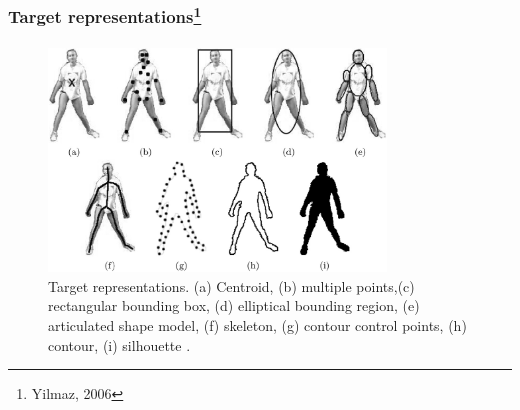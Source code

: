 \begin{frame}
\frametitle{Target representations\footnote{Yilmaz, 2006}}
\framesubtitle{}
\logoCSIPCPL\mypagenum
\begin{figure}[t]
\center
\includegraphics[width=0.8\textwidth]{thesis/2006_JNL_TRKsurvey_Shah_fig1.png}
\caption{Target representations.  (a) Centroid, (b) multiple points,(c) rectangular bounding box, (d) elliptical bounding region, (e) articulated shape model, (f) skeleton, (g) contour control points, (h) contour, (i) silhouette \cite{2006_JNL_SURVEYtrk_Yilmaz}.}
\label{fig:TRK_objectRepresentations}
\end{figure}
\end{frame}


